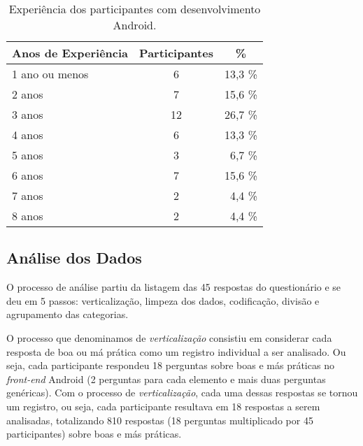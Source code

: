 \begin{table}[h]
\centering
\caption{Experi\^encia dos participantes com desenvolvimento Android.}
\small
\begin{tabular}{l|c|r}
\toprule
\textbf{Anos de Experi\^encia} & \textbf{Participantes} & \multicolumn{1}{c}{\textbf{\%}}  \\
\hline
1 ano ou menos 	&	 6 		& 	13,3 \%	 \\
2 anos 			& 	 7 		& 	15,6 \%	 \\
3 anos 			& 	 12		& 	26,7 \%	 \\
4 anos 			& 	 6 		& 	13,3 \%	 \\
5 anos 			& 	 3 		& 	 6,7 \%	 \\
6 anos 			& 	 7 		& 	15,6 \%	 \\
7 anos 			& 	 2 		& 	 4,4 \%	 \\
8 anos 			& 	 2 		& 	 4,4 \%	 \\
\toprule
\end{tabular}
\label{tab:DadosDemograficos}
\end{table}


\subsection{An\'alise dos Dados}
\label{sub:smells-definition}

O processo de an\'alise partiu da listagem das 45 respostas do question\'ario e se deu em 5 passos: verticaliza\c{c}\~ao, limpeza dos dados, codifica\c{c}\~ao, divis\~ao e agrupamento das categorias. 

O processo que denominamos de \textit{verticaliza\c{c}\~ao} consistiu em considerar cada resposta de boa ou m\'a pr\'atica como um registro individual a ser analisado. Ou seja, cada participante respondeu 18 perguntas sobre boas e m\'as pr\'aticas no \textit{front-end} Android (2 perguntas para cada elemento e mais duas perguntas gen\'ericas). Com o processo de \textit{verticaliza\c{c}\~ao}, cada uma dessas respostas se tornou um registro, ou seja, cada participante resultava em 18 respostas a serem analisadas, totalizando 810 respostas (18 perguntas multiplicado por 45 participantes) sobre boas e m\'as pr\'aticas.

